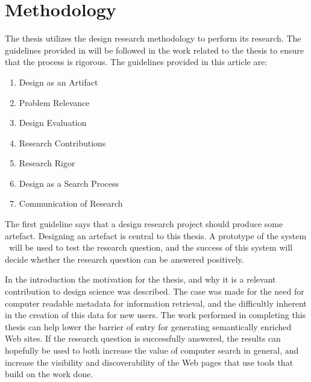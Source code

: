 
\chapter{Methodology} %

\label{Methodology} %


The thesis utilizes the design research methodology to perform its research.
The guidelines provided in \citet{Hevner2004} will be followed in the work related to the thesis to ensure that the process is rigorous.
The guidelines provided in this article are:
\begin{enumerate}
	\item \label{gl1}Design as an Artifact
	\item \label{gl2}Problem Relevance
	\item \label{gl3}Design Evaluation
	\item \label{gl4}Research Contributions
	\item \label{gl5}Research Rigor
	\item \label{gl6}Design as a Search Process
	\item \label{gl7}Communication of Research
\end{enumerate}

The first guideline says that a design research project should produce some artefact.
Designing an artefact is central to this thesis.
A prototype of the system \theartefact\ will be used to test the research question,
and the success of this system will decide whether the research question can be answered positively.

In the introduction the motivation for the thesis, and why it is a relevant contribution to design science was described.
The case was made for the need for computer readable metadata for information retrieval,
and the difficultly inherent in the creation of this data for new users.
The work performed in completing this thesis can help lower the barrier of entry for generating semantically enriched Web sites.
If the research question is successfully answered, the results can hopefully be used to both increase the value of computer search in general,
and increase the visibility and discoverability of the Web pages that use tools that build on the work done.

